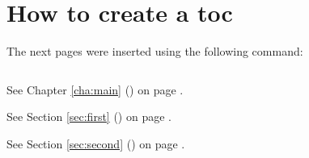 \documentclass[a4paper]{book}
\begin{document}
\tableofcontents

\chapter{How to create a toc}

The next pages were inserted using the following command:

\begin{verbatim}

\end{verbatim}

\noindent
See Chapter \ref{cha:main} () on page
\pageref{cha:main}.\par\noindent
See Section \ref{sec:first} () on page
\pageref{sec:first}.\par\noindent
See Section \ref{sec:second} () on page
\pageref{sec:second}.


\end{document}
